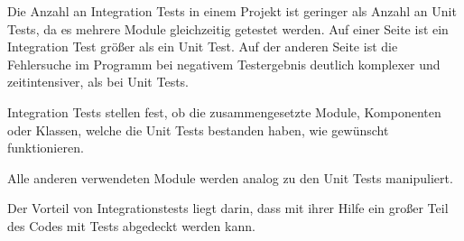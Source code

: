 Die Anzahl an Integration Tests in einem Projekt ist geringer als Anzahl an Unit Tests, da es mehrere Module gleichzeitig getestet werden.
Auf einer Seite ist ein Integration Test größer als ein Unit Test. 
Auf der anderen Seite ist die Fehlersuche im Programm bei negativem Testergebnis deutlich komplexer und zeitintensiver, 
als bei Unit Tests.

Integration Tests stellen fest, ob die zusammengesetzte Module, Komponenten oder Klassen, welche die Unit Tests bestanden haben, wie gewünscht funktionieren.

Alle anderen verwendeten Module werden analog zu den Unit Tests manipuliert.

Der Vorteil von Integrationstests liegt darin, dass mit ihrer Hilfe ein großer Teil des Codes mit Tests abgedeckt werden kann.